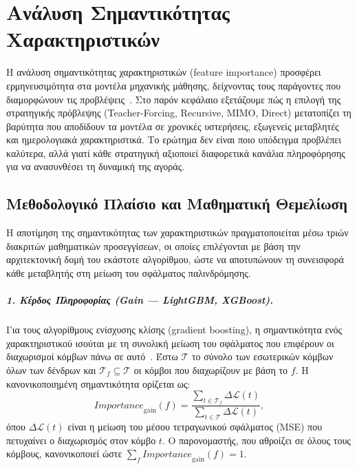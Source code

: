 \chapter{Ανάλυση Σημαντικότητας Χαρακτηριστικών}
\label{ch:fi}

Η ανάλυση σημαντικότητας χαρακτηριστικών (feature importance) προσφέρει ερμηνευσιμότητα στα μοντέλα μηχανικής μάθησης, δείχνοντας τους παράγοντες που διαμορφώνουν τις προβλέψεις~\cite{ke2017lgbm, breiman2001rf}. Στο παρόν κεφάλαιο εξετάζουμε πώς η επιλογή της στρατηγικής πρόβλεψης (Teacher-Forcing, Recursive, MIMO, Direct) μετατοπίζει τη βαρύτητα που αποδίδουν τα μοντέλα σε χρονικές υστερήσεις, εξωγενείς μεταβλητές και ημερολογιακά χαρακτηριστικά. Το ερώτημα δεν είναι ποιο υπόδειγμα προβλέπει καλύτερα, αλλά γιατί κάθε στρατηγική αξιοποιεί διαφορετικά κανάλια πληροφόρησης για να ανασυνθέσει τη δυναμική της αγοράς.

\section{Μεθοδολογικό Πλαίσιο και Μαθηματική Θεμελίωση}
\label{sec:fi_methodology}

Η αποτίμηση της σημαντικότητας των χαρακτηριστικών πραγματοποιείται μέσω τριών διακριτών μαθηματικών προσεγγίσεων, οι οποίες επιλέγονται με βάση την αρχιτεκτονική δομή του εκάστοτε αλγορίθμου, ώστε να αποτυπώνουν τη συνεισφορά κάθε μεταβλητής στη μείωση του σφάλματος παλινδρόμησης.

\paragraph*{1. Κέρδος Πληροφορίας (Gain --- LightGBM, XGBoost).}
Για τους αλγορίθμους ενίσχυσης κλίσης (gradient boosting), η σημαντικότητα ενός
χαρακτηριστικού ισούται με τη συνολική μείωση του σφάλματος που επιφέρουν οι διαχωρισμοί
κόμβων πάνω σε αυτό~\cite{ke2017lgbm}. Έστω $\mathcal{T}$ το σύνολο των εσωτερικών κόμβων
όλων των δένδρων και $\mathcal{T}_f \subseteq \mathcal{T}$ οι κόμβοι που διαχωρίζουν με
βάση το $f$. Η κανονικοποιημένη σημαντικότητα ορίζεται ως:
\begin{equation}
    \mathit{Importance}_{\mathrm{gain}}(f) =
    \frac{\sum_{t \in \mathcal{T}_f} \Delta\mathcal{L}(t)}
         {\sum_{t \in \mathcal{T}} \Delta\mathcal{L}(t)},
    \label{eq:fi_gain}
\end{equation}
όπου $\Delta\mathcal{L}(t)$ είναι η μείωση του μέσου τετραγωνικού σφάλματος (MSE) που
πετυχαίνει ο διαχωρισμός στον κόμβο $t$. Ο παρονομαστής, που αθροίζει σε όλους τους
κόμβους, κανονικοποιεί ώστε $\sum_{f} \mathit{Importance}_{\mathrm{gain}}(f) = 1$.

